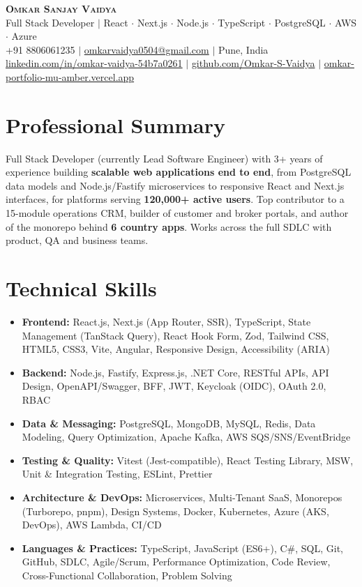 \documentclass[letterpaper,10pt]{article}
\newcommand{\resumeItem}[1]{\item\small{{#1 \vspace{-2pt}}}}
\newcommand{\resumeSubItem}[1]{\resumeItem{#1}\vspace{-2pt}}
\newcommand{\resumeSubHeadingListStart}{\begin{itemize}[leftmargin=0.15in, label={}]}
\newcommand{\resumeSubHeadingListEnd}{\end{itemize}}
\begin{document}
\begin{center}
\textbf{\Huge \scshape Omkar Sanjay Vaidya} \\ \vspace{2pt}
\large Full Stack Developer $|$ React $\cdot$ Next.js $\cdot$ Node.js $\cdot$ TypeScript $\cdot$ PostgreSQL $\cdot$ AWS $\cdot$ Azure \\ \vspace{2pt}
\small +91 8806061235 $|$
\href{mailto:omkarvaidya0504@gmail.com}{omkarvaidya0504@gmail.com} $|$
Pune, India \\
\href{https://www.linkedin.com/in/omkar-vaidya-54b7a0261/}{linkedin.com/in/omkar-vaidya-54b7a0261} $|$
\href{https://github.com/Omkar-S-Vaidya}{github.com/Omkar-S-Vaidya} $|$
\href{https://omkar-portfolio-mu-amber.vercel.app/}{omkar-portfolio-mu-amber.vercel.app}
\end{center}

\section{Professional Summary}
\small{Full Stack Developer (currently Lead Software Engineer) with 3+ years of experience building \textbf{scalable web applications end to end}, from PostgreSQL data models and Node.js/Fastify microservices to responsive React and Next.js interfaces, for platforms serving \textbf{120,000+ active users}. Top contributor to a 15-module operations CRM, builder of customer and broker portals, and author of the monorepo behind \textbf{6 country apps}. Works across the full SDLC with product, QA and business teams.}

\section{Technical Skills}
\resumeSubHeadingListStart
\resumeSubItem{\textbf{Frontend:} React.js, Next.js (App Router, SSR), TypeScript, State Management (TanStack Query), React Hook Form, Zod, Tailwind CSS, HTML5, CSS3, Vite, Angular, Responsive Design, Accessibility (ARIA)}
\resumeSubItem{\textbf{Backend:} Node.js, Fastify, Express.js, .NET Core, RESTful APIs, API Design, OpenAPI/Swagger, BFF, JWT, Keycloak (OIDC), OAuth 2.0, RBAC}
\resumeSubItem{\textbf{Data \& Messaging:} PostgreSQL, MongoDB, MySQL, Redis, Data Modeling, Query Optimization, Apache Kafka, AWS SQS/SNS/EventBridge}
\resumeSubItem{\textbf{Testing \& Quality:} Vitest (Jest-compatible), React Testing Library, MSW, Unit \& Integration Testing, ESLint, Prettier}
\resumeSubItem{\textbf{Architecture \& DevOps:} Microservices, Multi-Tenant SaaS, Monorepos (Turborepo, pnpm), Design Systems, Docker, Kubernetes, Azure (AKS, DevOps), AWS Lambda, CI/CD}
\resumeSubItem{\textbf{Languages \& Practices:} TypeScript, JavaScript (ES6+), C\#, SQL, Git, GitHub, SDLC, Agile/Scrum, Performance Optimization, Code Review, Cross-Functional Collaboration, Problem Solving}
\resumeSubHeadingListEnd
\end{document}
